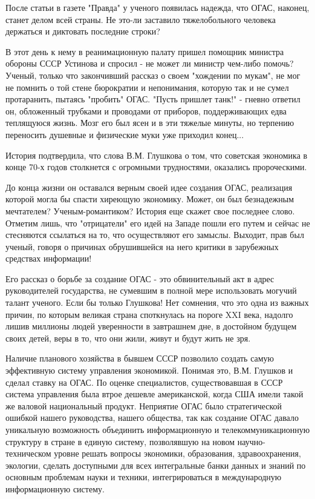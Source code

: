 После статьи в газете "Правда" у ученого появилась надежда, что ОГАС, наконец,
станет делом всей страны. Не это-ли заставило тяжелобольного человека держаться
и диктовать последние строки?

В этот день к нему в реанимационную палату пришел помощник министра обороны СССР
Устинова и спросил - не может ли министр чем-либо помочь? Ученый, только что
закончивший рассказ о своем "хождении по мукам", не мог не помнить о той стене
бюрократии и непонимания, которую так и не сумел протаранить, пытаясь "пробить"
ОГАС. "Пусть пришлет танк!" - гневно ответил он, обложенный трубками и проводами
от приборов, поддерживающих едва теплящуюся жизнь. Мозг его был ясен и в эти
тяжелые минуты, но терпению переносить душевные и физические муки уже приходил
конец...

История подтвердила, что слова В.М. Глушкова о том, что советская экономика в
конце 70-х годов столкнется с огромными трудностями, оказались пророческими.

До конца жизни он оставался верным своей идее создания ОГАС, реализация которой
могла бы спасти хиреющую экономику. Может, он был безнадежным мечтателем?
Ученым-романтиком? История еще скажет свое последнее слово. Отметим лишь, что
"отрицатели" его идей на Западе пошли его путем и сейчас не стесняются ссылаться
на то, что осуществляют его замыслы. Выходит, прав был ученый, говоря о причинах
обрушившейся на него критики в зарубежных средствах информации!

Его рассказ о борьбе за создание ОГАС - это обвинительный акт в адрес
руководителей государства, не сумевшим в полной мере использовать могучий талант
ученого. Если бы только Глушкова! Нет сомнения, что это одна из важных причин,
по которым великая страна споткнулась на пороге XXI века, надолго лишив миллионы
людей уверенности в завтрашнем дне, в достойном будущем своих детей, веры в то,
что они жили, живут и будут жить не зря.

Наличие планового хозяйства в бывшем СССР позволило создать самую эффективную
систему управления экономикой. Понимая это, В.М. Глушков и сделал ставку на
ОГАС. По оценке специалистов, существовавшая в СССР система управления была
втрое дешевле американской, когда США имели такой же валовой национальный
продукт. Неприятие ОГАС было стратегической ошибкой нашего руководства, нашего
общества, так как создание ОГАС давало уникальную возможность объединить
информационную и телекоммуникационную структуру в стране в единую систему,
позволявшую на новом научно-техническом уровне решать вопросы экономики,
образования, здравоохранения, экологии, сделать доступными для всех интегральные
банки данных и знаний по основным проблемам науки и техники, интегрироваться в
международную информационную систему.

